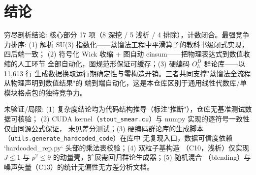 \documentclass[UTF8]{ctexart}
\begin{document}
\section{结论}
\begin{conclbox}
穷尽剖析结论: 核心部分 17 项（\textcolor{accent}{8 深挖} / \textcolor{phys}{5 浅析} /
\textcolor{warn}{4 排除}），计数闭合。最强竞争力排序:
(1) \textcolor{algo}{解析 SU(3) 指数化}——蒸馏法工程中平滑算子的教科书级闭式实现，四后端一致；
(2) \textcolor{algo}{符号化 Wick 收缩 + 图自动 einsum}——把物理表达式到数值收缩的人工环节
全部自动化，图规范形保证可缓存；(3) \textcolor{phys}{硬编码 $O_h^D$ 群论库}——以 11{,}613 行
生成数据换取运行期确定性与零构造开销。三者共同支撑"蒸馏法全流程从物理声明到数值结果"的
端到端自动化，这是本仓库区别于通用线性代数库/单模块格点包的独特竞争力。
\end{conclbox}

\begin{warnbox}
未验证/局限: (1) 复杂度结论均为代码结构推导（标注"推断"），仓库无基准测试数据可核验；
(2) CUDA kernel（\texttt{stout\_smear.cu}）与 numpy 实现的逐符号一致性仅由同源公式保证，
未见差分测试；(3) 硬编码群论库的生成脚本（\texttt{utils.generate\_hardcoded\_code}）在库中
无复现入口，数据可信度依赖 `hardcoded\_rep.py` 头部的乘法表校验；(4) 双粒子基构造
（C10，浅析）仅实现 $J\le 1$ 与 $p^2 \le 9$ 的动量壳，扩展需回归群论生成器；(5) 随机混合
（blending）与噪声矢量（C13）的统计无偏性无方差分析文档。
\end{warnbox}
\end{document}

